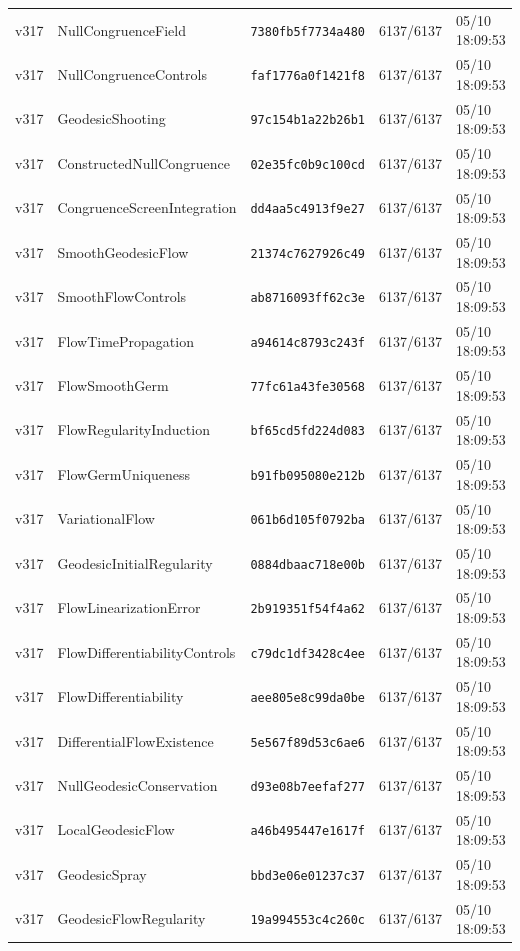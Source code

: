\documentclass[11pt]{article}
\theoremstyle{definition}\newtheorem{deriv}{Derivation}
\begin{document}
{\begin{longtable}{@{}lllll@{}}
v317 & NullCongruenceField & \texttt{7380fb5f7734a480} & 6137/6137 & 05/10 18:09:53 \\
v317 & NullCongruenceControls & \texttt{faf1776a0f1421f8} & 6137/6137 & 05/10 18:09:53 \\
v317 & GeodesicShooting & \texttt{97c154b1a22b26b1} & 6137/6137 & 05/10 18:09:53 \\
v317 & ConstructedNullCongruence & \texttt{02e35fc0b9c100cd} & 6137/6137 & 05/10 18:09:53 \\
v317 & CongruenceScreenIntegration & \texttt{dd4aa5c4913f9e27} & 6137/6137 & 05/10 18:09:53 \\
v317 & SmoothGeodesicFlow & \texttt{21374c7627926c49} & 6137/6137 & 05/10 18:09:53 \\
v317 & SmoothFlowControls & \texttt{ab8716093ff62c3e} & 6137/6137 & 05/10 18:09:53 \\
v317 & FlowTimePropagation & \texttt{a94614c8793c243f} & 6137/6137 & 05/10 18:09:53 \\
v317 & FlowSmoothGerm & \texttt{77fc61a43fe30568} & 6137/6137 & 05/10 18:09:53 \\
v317 & FlowRegularityInduction & \texttt{bf65cd5fd224d083} & 6137/6137 & 05/10 18:09:53 \\
v317 & FlowGermUniqueness & \texttt{b91fb095080e212b} & 6137/6137 & 05/10 18:09:53 \\
v317 & VariationalFlow & \texttt{061b6d105f0792ba} & 6137/6137 & 05/10 18:09:53 \\
v317 & GeodesicInitialRegularity & \texttt{0884dbaac718e00b} & 6137/6137 & 05/10 18:09:53 \\
v317 & FlowLinearizationError & \texttt{2b919351f54f4a62} & 6137/6137 & 05/10 18:09:53 \\
v317 & FlowDifferentiabilityControls & \texttt{c79dc1df3428c4ee} & 6137/6137 & 05/10 18:09:53 \\
v317 & FlowDifferentiability & \texttt{aee805e8c99da0be} & 6137/6137 & 05/10 18:09:53 \\
v317 & DifferentialFlowExistence & \texttt{5e567f89d53c6ae6} & 6137/6137 & 05/10 18:09:53 \\
v317 & NullGeodesicConservation & \texttt{d93e08b7eefaf277} & 6137/6137 & 05/10 18:09:53 \\
v317 & LocalGeodesicFlow & \texttt{a46b495447e1617f} & 6137/6137 & 05/10 18:09:53 \\
v317 & GeodesicSpray & \texttt{bbd3e06e01237c37} & 6137/6137 & 05/10 18:09:53 \\
v317 & GeodesicFlowRegularity & \texttt{19a994553c4c260c} & 6137/6137 & 05/10 18:09:53 \\

\end{longtable}}
\end{document}
